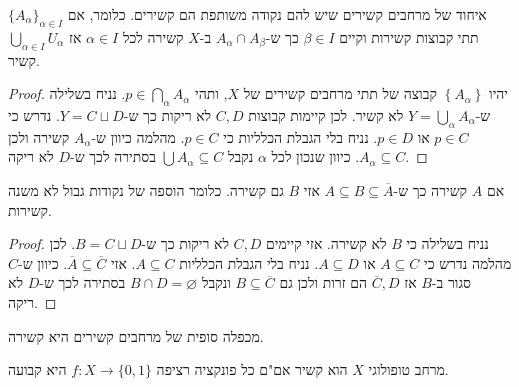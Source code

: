 \documentclass{tstextbook}
\begin{document}
\begin{proposition}
איחוד של מרחבים קשירים שיש להם נקודה משותפת הם קשירים. כלומר, אם \(\{ A_{\alpha} \}_{\alpha \in I}\) תתי קבוצות קשירות וקיים \(\beta \in I\) כך ש-\(A_{\alpha} \cap A_{\beta}\) ב-\(X\) קשירה לכל \(\alpha \in I\) אז \(\bigcup_{\alpha \in I}U_{\alpha}\) קשיר.

\end{proposition}
\begin{proof}
יהיו \(\left\{  A_{\alpha}  \right\}\) קבוצה של תתי מרחבים קשירים של \(X\), ותהי \(p \in \bigcap_{\alpha} A_{\alpha}\). נניח בשלילה ש-\(Y=\bigcup_{\alpha}A_{\alpha}\) לא קשיר. לכן קיימות קבוצות \(C,D\) לא ריקות כך ש-\(Y=C\sqcup D\). נדרש כי \(p \in C\) או \(p \in D\). נניח בלי הגבלת הכלליות כי \(p \in C\). מהלמה כיוון ש-\(A_{\alpha}\) קשירה ולכן \(A_{\alpha}\subseteq C\). כיוון שנכון לכל \(\alpha\) נקבל \(\bigcup A_{\alpha}\subseteq C\) בסתירה לכך ש-\(D\) לא ריקה.

\end{proof}
\begin{proposition}
אם \(A\) קשירה כך ש-\(A\subseteq B\subseteq \overline{A}\) אזי \(B\) גם קשירה. כלומר הוספה של נקודות גבול לא משנה קשירות. 

\end{proposition}
\begin{proof}
נניח בשלילה כי \(B\) לא קשירה. אזי קיימים \(C,D\) לא ריקות כך ש-\(B=C\sqcup D\). לכן מהלמה נדרש כי \(A\subseteq C\) או \(A\subseteq D\). נניח בלי הגבלת הכלליות \(A\subseteq C\). אזי \(\overline{A}\subseteq \overline{C}\). כיוון ש-\(C\) סגור ב-\(B\) אז \(\overline{C},D\) הם זרות ולכן גם \(B\subseteq \overline{C}\) ונקבל \(B\cap D=\varnothing\) בסתירה לכך ש-\(D\) לא ריקה. 

\end{proof}
\begin{proposition}
מכפלה סופית של מרחבים קשירים היא קשירה.

\end{proposition}
\begin{proposition}
מרחב טופולוגי \(X\) הוא קשיר אם"ם כל פונקציה רציפה \(f:X\to \{ 0,1 \}\) היא קבועה.

\end{proposition}
\end{document}
